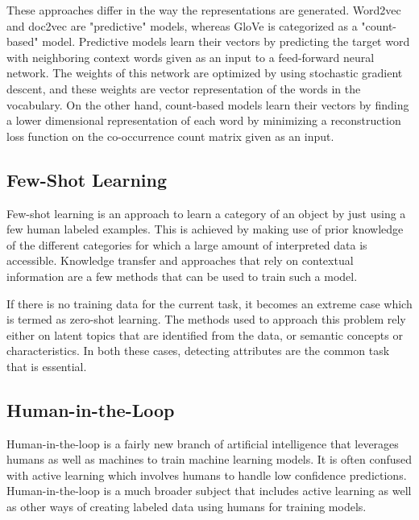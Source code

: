 \documentclass[11pt,letterpaper]{article}
\begin{document}
These approaches differ in the way the representations are generated.  Word2vec and doc2vec are "predictive" models, whereas GloVe is categorized as a "count-based" model.  Predictive models learn their vectors by predicting the target word with neighboring context words given as an input to a feed-forward neural network.  The weights of this network are optimized by using stochastic gradient descent, and these weights are vector representation of the words in the vocabulary.  On the other hand, count-based models learn their vectors by finding a lower dimensional representation of each word by minimizing a reconstruction loss function on the co-occurrence count matrix given as an input.

\subsection*{Few-Shot Learning}
Few-shot learning is an approach to learn a category of an object by just using a few human labeled examples.  This is achieved by making use of prior knowledge of the different categories for which a large amount of interpreted data is accessible.  Knowledge transfer and approaches that rely on contextual information are a few methods that can be used to train such a model.

If there is no training data for the current task, it becomes an extreme case which is termed as zero-shot learning.  The methods used to approach this problem rely either on latent topics that are identified from the data, or semantic concepts or characteristics.  In both these cases, detecting attributes are the common task that is essential.

\subsection*{Human-in-the-Loop}
Human-in-the-loop is a fairly new branch of artificial intelligence that leverages humans as well as machines to train machine learning models. It is often confused with active learning which involves humans to handle low confidence predictions.  Human-in-the-loop is a much broader subject that includes active learning as well as other ways of creating labeled data using humans for training models.
\end{document}
